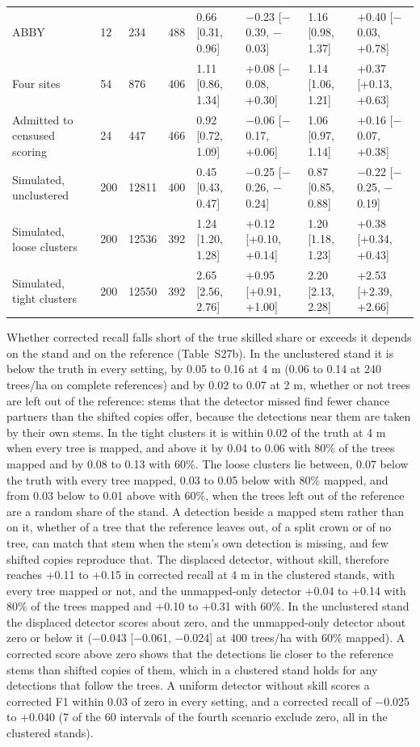 \documentclass[10pt,a4paper]{article}
\begin{document}
{\begin{xltabular}{\textwidth}{LlllLLLL}
ABBY & 12 & 234 & 488 & 0.66 [0.31, 0.96] & $-$0.23 [$-$0.39, $-$0.03] & 1.16 [0.98, 1.37] & +0.40 [$-$0.03, +0.78] \\
Four sites & 54 & 876 & 406 & 1.11 [0.86, 1.34] & +0.08 [$-$0.08, +0.30] & 1.14 [1.06, 1.21] & +0.37 [+0.13, +0.63] \\
Admitted to censused scoring & 24 & 447 & 466 & 0.92 [0.72, 1.09] & $-$0.06 [$-$0.17, +0.06] & 1.06 [0.97, 1.14] & +0.16 [$-$0.07, +0.38] \\
Simulated, unclustered & 200 & 12811 & 400 & 0.45 [0.43, 0.47] & $-$0.25 [$-$0.26, $-$0.24] & 0.87 [0.85, 0.88] & $-$0.22 [$-$0.25, $-$0.19] \\
Simulated, loose clusters & 200 & 12536 & 392 & 1.24 [1.20, 1.28] & +0.12 [+0.10, +0.14] & 1.20 [1.18, 1.23] & +0.38 [+0.34, +0.43] \\
Simulated, tight clusters & 200 & 12550 & 392 & 2.65 [2.56, 2.76] & +0.95 [+0.91, +1.00] & 2.20 [2.13, 2.28] & +2.53 [+2.39, +2.66] \\
\end{xltabular}
}

Whether corrected recall falls short of the true skilled share or exceeds it
depends on the stand and on the reference (Table~S27b). In the unclustered stand
it is below the truth in every setting, by 0.05 to 0.16 at 4 m (0.06 to 0.14 at
240 trees/ha on complete references) and by 0.02 to 0.07 at 2 m, whether or not
trees are left out of the reference: stems that the detector missed find fewer
chance partners than the shifted copies offer, because the detections near them
are taken by their own stems. In the tight clusters it is within 0.02 of the
truth at 4 m when every tree is mapped, and above it by 0.04 to 0.06 with 80\% of
the trees mapped and by 0.08 to 0.13 with 60\%. The loose clusters lie between,
0.07 below the truth with every tree mapped, 0.03 to 0.05 below with 80\% mapped,
and from 0.03 below to 0.01 above with 60\%, when the trees left out of the
reference are a random share of the stand. A detection beside a mapped stem
rather than on it, whether of a tree that the reference leaves out, of a split
crown or of no tree, can match that stem when the stem's own detection is
missing, and few shifted copies reproduce that. The displaced detector, without
skill, therefore reaches +0.11 to +0.15 in corrected recall at 4 m in the
clustered stands, with every tree mapped or not, and the unmapped-only detector
+0.04 to +0.14 with 80\% of the trees mapped and +0.10 to +0.31 with 60\%. In the
unclustered stand the displaced detector scores about zero, and the
unmapped-only detector about zero or below it ($-$0.043 [$-$0.061, $-$0.024] at 400
trees/ha with 60\% mapped). A corrected score above zero shows that the
detections lie closer to the reference stems than shifted copies of them, which
in a clustered stand holds for any detections that follow the trees. A uniform
detector without skill scores a corrected F1 within 0.03 of zero in every
setting, and a corrected recall of $-$0.025 to +0.040 (7 of the 60 intervals of
the fourth scenario exclude zero, all in the clustered stands).
\end{document}
